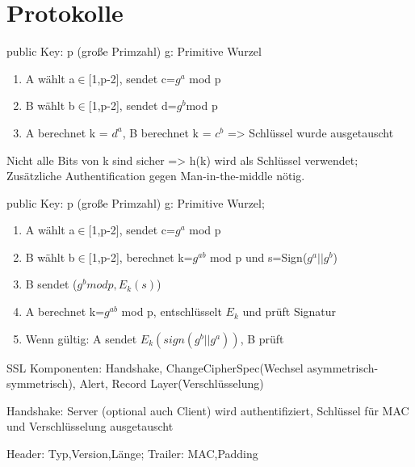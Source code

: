 \section*{Protokolle}
public Key: p (große Primzahl) g: Primitive Wurzel
\begin{enumerate}
\item A wählt a$\in$[1,p-2], sendet c=$g^a$ mod p
\item B wählt b$\in$[1,p-2], sendet d=$g^b$mod p
\item A berechnet k = $d^a$, B berechnet k = $c^b$ => Schlüssel wurde ausgetauscht
\end{enumerate}%
Nicht alle Bits von k sind sicher => h(k) wird als Schlüssel verwendet;\\
Zusätzliche Authentification gegen Man-in-the-middle nötig.

public Key: p (große Primzahl) g: Primitive Wurzel; %
\begin{enumerate}
\item A wählt a$\in$[1,p-2], sendet c=$g^a$ mod p
\item B wählt b$\in$[1,p-2], berechnet k=$g^{ab}$ mod p und s=Sign($g^a||g^b$)
\item B sendet ($g^b mod p,E_k(s)$)
\item A berechnet k=$g^{ab}$ mod p, entschlüsselt $E_k$ und prüft Signatur
\item Wenn gültig: A sendet $E_k(sign(g^b||g^a))$, B prüft
\end{enumerate}


SSL Komponenten: Handshake, ChangeCipherSpec(Wechsel asymmetrisch-symmetrisch), Alert, Record Layer(Verschlüsselung)

Handshake: Server (optional auch Client) wird authentifiziert, Schlüssel für MAC und Verschlüsselung ausgetauscht

Header: Typ,Version,Länge; Trailer: MAC,Padding

